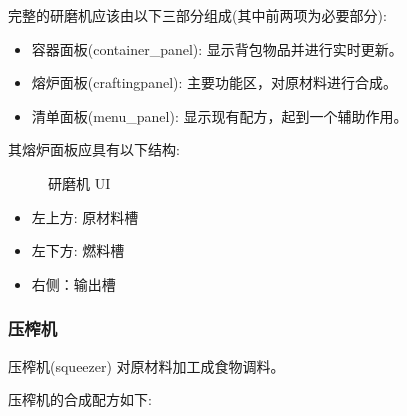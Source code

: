 完整的研磨机应该由以下三部分组成(其中前两项为必要部分):
\begin{itemize}
    \item 容器面板(container\_panel): 显示背包物品并进行实时更新。
    \item 熔炉面板(crafting\-panel): 主要功能区，对原材料进行合成。
    \item 清单面板(menu\_panel): 显示现有配方，起到一个辅助作用。
\end{itemize}

其熔炉面板应具有以下结构:

\begin{figure}[H]
    \centering
    \caption{研磨机 UI}
\end{figure}

\begin{itemize}
    \item 左上方: 原材料槽
    \item 左下方: 燃料槽
    \item 右侧：输出槽
\end{itemize}

\subsubsection{压榨机}

压榨机(squeezer) 对原材料加工成食物调料。

压榨机的合成配方如下:

